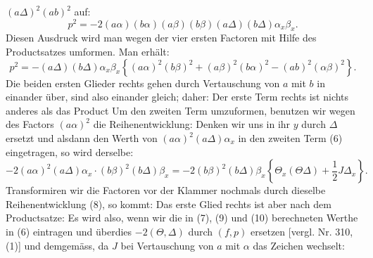 $(a\Delta)^2(ab)^2$ auf:
\[
p^2 = -2(a\alpha)(b\alpha)(a\beta)(b\beta)(a\Delta)(b\Delta)\alpha_x\beta_x.
\]
Diesen Ausdruck wird man wegen der vier ersten Factoren mit Hilfe des Productsatzes umformen. Man erhält:
\[
p^2 = -(a\Delta)(b\Delta)\alpha_x\beta_x\left\{(a\alpha)^2(b\beta)^2+(a\beta)^2(b\alpha)^2-(ab)^2(\alpha\beta)^2\right\}.
\]
Die beiden ersten Glieder rechts gehen durch Vertauschung von $a$ mit $b$ in einander über, sind also einander gleich; daher:
Der erste Term rechts ist nichts anderes als das Product
Um den zweiten Term umzuformen, benutzen wir wegen des Factors $(a\alpha)^2$ die Reihenentwicklung:
Denken wir uns in ihr $y$ durch $\Delta$ ersetzt und alsdann den Werth von $(a\alpha)^2(a\Delta)\alpha_x$ in den zweiten Term (6) eingetragen, so wird derselbe:
\[
-2(a\alpha)^2(a\Delta)\alpha_x\cdot(b\beta)^2(b\Delta)\beta_x = -2(b\beta)^2(b\Delta)\beta_x\left\{\Theta_x(\Theta\Delta)+\frac{1}{2}J\Delta_x\right\}.
\]
Transformiren wir die Factoren vor der Klammer nochmals durch dieselbe Reihenentwicklung (8), so kommt:
Das erste Glied rechts ist aber nach dem Productsatze:
Es wird also, wenn wir die in (7), (9) und (10) berechneten Werthe in (6) eintragen und überdies $-2(\Theta,\Delta)$ durch $(f,p)$ ersetzen [vergl. Nr. 310, (1)]
und demgemäss, da $J$ bei Vertauschung von $a$ mit $\alpha$ das Zeichen wechselt:


